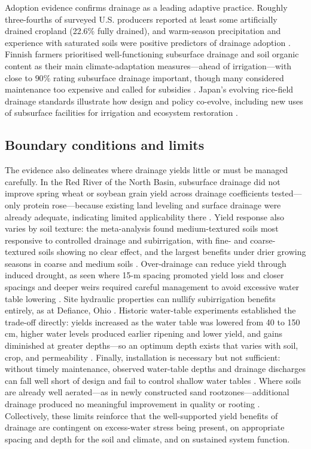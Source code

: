 \documentclass[11pt]{article}
\begin{document}
Adoption evidence confirms drainage as a leading adaptive practice. Roughly three-fourths of surveyed U.S. producers reported at least some artificially drained cropland (22.6\% fully drained), and warm-season precipitation and experience with saturated soils were positive predictors of drainage adoption \parencite{Morton2015}. Finnish farmers prioritised well-functioning subsurface drainage and soil organic content as their main climate-adaptation measures—ahead of irrigation—with close to \(90\%\) rating subsurface drainage important, though many considered maintenance too expensive and called for subsidies \parencite{PeltonenSainio2021}. Japan's evolving rice-field drainage standards illustrate how design and policy co-evolve, including new uses of subsurface facilities for irrigation and ecosystem restoration \parencite{Ogino2007}.

\subsection{Boundary conditions and limits}

The evidence also delineates where drainage yields little or must be managed carefully. In the Red River of the North Basin, subsurface drainage did not improve spring wheat or soybean grain yield across drainage coefficients tested—only protein rose—because existing land leveling and surface drainage were already adequate, indicating limited applicability there \parencite{Wiersma2010}. Yield response also varies by soil texture: the meta-analysis found medium-textured soils most responsive to controlled drainage and subirrigation, with fine- and coarse-textured soils showing no clear effect, and the largest benefits under drier growing seasons in coarse and medium soils \parencite{Singh2022b}. Over-drainage can reduce yield through induced drought, as seen where 15-m spacing promoted yield loss and closer spacings and deeper weirs required careful management to avoid excessive water table lowering \parencite{Cordeiro2015,DeBoer2006}. Site hydraulic properties can nullify subirrigation benefits entirely, as at Defiance, Ohio \parencite{Gunn2018,Gunn2019}. Historic water-table experiments established the trade-off directly: yields increased as the water table was lowered from 40 to 150 cm, higher water levels produced earlier ripening and lower yield, and gains diminished at greater depths—so an optimum depth exists that varies with soil, crop, and permeability \parencite{HOOGHOUDT1952}. Finally, installation is necessary but not sufficient: without timely maintenance, observed water-table depths and drainage discharges can fall well short of design and fail to control shallow water tables \parencite{Malota2016}. Where soils are already well aerated—as in newly constructed sand rootzones—additional drainage produced no meaningful improvement in quality or rooting \parencite{Bigelow2001}. Collectively, these limits reinforce that the well-supported yield benefits of drainage are contingent on excess-water stress being present, on appropriate spacing and depth for the soil and climate, and on sustained system function.

\printbibliography
\end{document}
